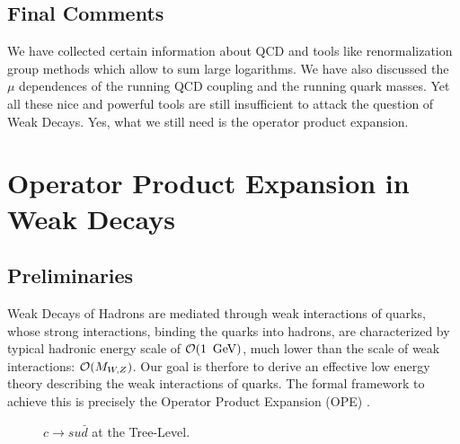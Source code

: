 \documentclass[12pt,rotate]{article}
\newcommand{\gev}{\, {\rm GeV}}
\newcommand{\ord}{{\cal O}}
\begin{document}
\begin{itemize}
\begin{itemize}
\subsection{Final Comments}
We have collected certain information about QCD and tools
like  renormalization group methods
which allow to sum large logarithms. We have also discussed
the $\mu$ dependences of the running QCD coupling and the running
quark masses. Yet all these nice and powerful tools are still
insufficient to attack the question of Weak Decays. Yes, what we
still need is the operator product expansion.

\section{Operator Product Expansion in Weak Decays}
            \label{sec:basicform:prelim}
\setcounter{equation}{0}
\subsection{Preliminaries}
Weak Decays of Hadrons are mediated through weak interactions of quarks,
whose strong interactions, binding the quarks into hadrons, are
characterized by typical hadronic energy scale of $\ord (1~\gev)$,
much lower than the
scale of weak interactions: $\ord (M_{W,Z})$.
Our goal is therfore to  derive
an effective low energy theory describing the weak interactions of
quarks. 
The formal framework to achieve this is precisely the 
Operator Product Expansion (OPE) \cite{OPE,ZIMM,WIT}. 
\begin{figure}[hbt]
\vspace{0.10in}
\centerline{
\epsfysize=2in
}%
\vspace{0.08in}
\caption[]{$c\to su\bar d$ at the Tree-Level.
\label{L:4}}
\end{figure}


\end{itemize}
\end{itemize}
\end{document}
